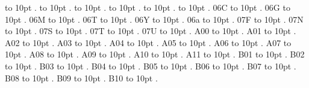  \leaders\hbox to 10pt {\hss.\hss}  \hfill {}
 \leaders\hbox to 10pt {\hss.\hss}  \hfill {}
 \leaders\hbox to 10pt {\hss.\hss}  \hfill {}
 \leaders\hbox to 10pt {\hss.\hss}  \hfill {}
 \leaders\hbox to 10pt {\hss.\hss}  \hfill {}
 \leaders\hbox to 10pt {\hss.\hss}  \hfill {}
\smallskip
06C \leaders\hbox to 10pt {\hss.\hss}  \hfill {}
\smallskip
06G \leaders\hbox to 10pt {\hss.\hss}  \hfill {}
\smallskip
06M \leaders\hbox to 10pt {\hss.\hss}  \hfill {}
\smallskip
06T \leaders\hbox to 10pt {\hss.\hss}  \hfill {}
\smallskip
06Y \leaders\hbox to 10pt {\hss.\hss}  \hfill {}
\smallskip
06a \leaders\hbox to 10pt {\hss.\hss}  \hfill {}
\smallskip
07F \leaders\hbox to 10pt {\hss.\hss}  \hfill {}
\smallskip
07N \leaders\hbox to 10pt {\hss.\hss}  \hfill {}
\smallskip
07S \leaders\hbox to 10pt {\hss.\hss}  \hfill {}
\smallskip
07T \leaders\hbox to 10pt {\hss.\hss}  \hfill {}
\smallskip
07U \leaders\hbox to 10pt {\hss.\hss}  \hfill {}
\smallskip
A00 \leaders\hbox to 10pt {\hss.\hss}  \hfill {}
\smallskip
A01 \leaders\hbox to 10pt {\hss.\hss}  \hfill {}
\smallskip
A02 \leaders\hbox to 10pt {\hss.\hss}  \hfill {}
\smallskip
A03 \leaders\hbox to 10pt {\hss.\hss}  \hfill {}
\smallskip
A04 \leaders\hbox to 10pt {\hss.\hss}  \hfill {}
\smallskip
A05 \leaders\hbox to 10pt {\hss.\hss}  \hfill {}
\smallskip
A06 \leaders\hbox to 10pt {\hss.\hss}  \hfill {}
\smallskip
A07 \leaders\hbox to 10pt {\hss.\hss}  \hfill {}
\smallskip
A08 \leaders\hbox to 10pt {\hss.\hss}  \hfill {}
\smallskip
A09 \leaders\hbox to 10pt {\hss.\hss}  \hfill {}
\smallskip
A10 \leaders\hbox to 10pt {\hss.\hss}  \hfill {}
\smallskip
A11 \leaders\hbox to 10pt {\hss.\hss}  \hfill {}
\smallskip
B01 \leaders\hbox to 10pt {\hss.\hss}  \hfill {}
\smallskip
B02 \leaders\hbox to 10pt {\hss.\hss}  \hfill {}
\smallskip
B03 \leaders\hbox to 10pt {\hss.\hss}  \hfill {}
\smallskip
B04 \leaders\hbox to 10pt {\hss.\hss}  \hfill {}
\smallskip
B05 \leaders\hbox to 10pt {\hss.\hss}  \hfill {}
\smallskip
B06 \leaders\hbox to 10pt {\hss.\hss}  \hfill {}
\smallskip
B07 \leaders\hbox to 10pt {\hss.\hss}  \hfill {}
\smallskip
B08 \leaders\hbox to 10pt {\hss.\hss}  \hfill {}
\smallskip
B09 \leaders\hbox to 10pt {\hss.\hss}  \hfill {}
\smallskip
B10 \leaders\hbox to 10pt {\hss.\hss}  \hfill {}

